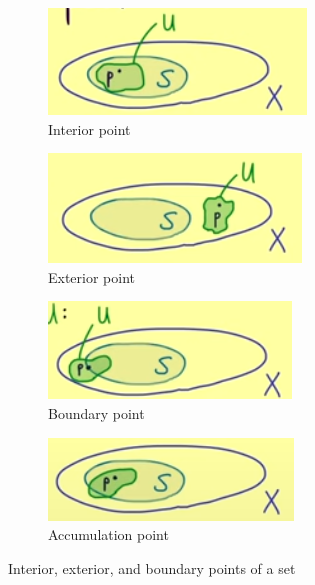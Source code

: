 \documentclass[11pt]{book} %
\begin{document}
\begin{figure}[H]
    \begin{subfigure}{0.24\textwidth}
        \centering
        \includegraphics[width=\textwidth]{Figs/interior.png}
        \caption{Interior point}
    \end{subfigure}
    \begin{subfigure}{0.24\textwidth}
        \centering
        \includegraphics[width=\textwidth]{Figs/exterior.png}
        \caption{Exterior point}
    \end{subfigure}
    \begin{subfigure}{0.24\textwidth}
        \centering
        \includegraphics[width=\textwidth]{Figs/boundary.png}
        \caption{Boundary point}
    \end{subfigure}
    \begin{subfigure}{0.24\textwidth}
        \centering
        \includegraphics[width=\textwidth]{Figs/accumulation.png}
        \caption{Accumulation point}
    \end{subfigure}
    \caption{Interior, exterior, and boundary points of a set}
\end{figure}
\end{document}
